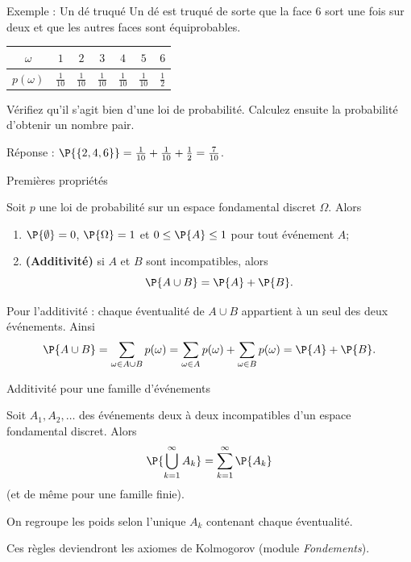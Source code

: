\documentclass[nuit,charter,pied,handout]{BeamerJS}
\begin{document}
\begin{frame}{Exemple : Un dé truqué}
\pause
	Un dé est truqué de sorte que la face \(6\) sort une fois sur deux et que les autres faces sont équiprobables.
	\pause
	\begin{center}
	\begin{tabular}{|c|c|c|c|c|c|c|}
		\hline
		\(\omega\) & \(1\) & \(2\) & \(3\) & \(4\) & \(5\) & \(6\) \\ \hline
		\(p(\omega)\) & \(\frac{1}{10}\) & \(\frac{1}{10}\) & \(\frac{1}{10}\) & \(\frac{1}{10}\) & \(\frac{1}{10}\) & \(\frac{1}{2}\) \\ \hline
	\end{tabular}
	\end{center}
	\pause
	\begin{cadre}
		Vérifiez qu'il s'agit bien d'une loi de probabilité. Calculez ensuite la probabilité d'obtenir un nombre pair.
	\end{cadre}
	\pause
	{\color{Dominante}Réponse : \(\P{\{2,4,6\}}=\frac{1}{10}+\frac{1}{10}+\frac{1}{2}=\frac{7}{10}\).}
\end{frame}

\begin{frame}[t]{Premières propriétés}
\pause
	\begin{prop}
		Soit \(p\) une loi de probabilité sur un espace fondamental discret \(\Omega\). Alors
		\begin{enumerate}
			\item \(\P{\emptyset}=0\), \(\P{\Omega}=1\) et \(0\leq\P{A}\leq 1\) pour tout événement \(A\);\pause
			\item \textbf{(Additivité)} si \(A\) et \(B\) sont incompatibles, alors
			\[\P{A\cup B}=\P{A}+\P{B}.\]
		\end{enumerate}
	\end{prop}
	\pause
	Pour l'additivité : chaque éventualité de \(A\cup B\) appartient à un seul des deux événements. Ainsi
	\[\P{A\cup B}=\sum_{\omega\in A\cup B}p(\omega)=\sum_{\omega\in A}p(\omega)+\sum_{\omega\in B}p(\omega)=\P{A}+\P{B}.\]
\end{frame}

\begin{frame}[t]{Additivité pour une famille d'événements}
\pause
	\begin{prop}
		Soit \(A_1,A_2,\ldots\) des événements deux à deux incompatibles d'un espace fondamental discret. Alors
		\[\P{\bigcup_{k=1}^{\infty}A_k}=\sum_{k=1}^{\infty}\P{A_k}\]
		(et de même pour une famille finie).
	\end{prop}
	\pause
	On regroupe les poids selon l'unique \(A_k\) contenant chaque éventualité.
	\pause
	\begin{lumiere}
		Ces règles deviendront les axiomes de Kolmogorov (module \emph{Fondements}).
	\end{lumiere}
\end{frame}
\end{document}
